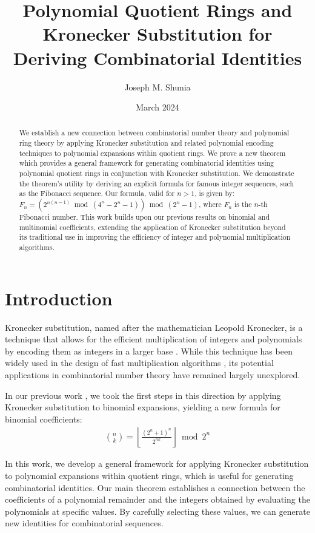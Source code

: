 \documentclass[12pt,reqno]{article}
\theoremstyle{plain}
\theoremstyle{definition}
\begin{document}
\title{Polynomial Quotient Rings and Kronecker Substitution for Deriving Combinatorial Identities}
\author{Joseph M. Shunia}
\date{March 2024}

\maketitle

\begin{abstract}
We establish a new connection between combinatorial number theory and polynomial ring theory by applying Kronecker substitution and related polynomial encoding techniques to polynomial expansions within quotient rings. We prove a new theorem which provides a general framework for generating combinatorial identities using polynomial quotient rings in conjunction with Kronecker substitution. We demonstrate the theorem's utility by deriving an explicit formula for famous integer sequences, such as the Fibonacci sequence. Our formula, valid for $n > 1$, is given by: $F_n = (2^{n (n - 1)} \bmod{(4^n-2^n-1)}) \bmod{(2^n-1)}$, where $F_n$ is the $n$-th Fibonacci number. This work builds upon our previous results on binomial and multinomial coefficients, extending the application of Kronecker substitution beyond its traditional use in improving the efficiency of integer and polynomial multiplication algorithms.
\end{abstract}

\section{Introduction}
Kronecker substitution, named after the mathematician Leopold Kronecker, is a technique that allows for the efficient multiplication of integers and polynomials by encoding them as integers in a larger base \cite{kronecker1882}. While this technique has been widely used in the design of fast multiplication algorithms \cite{harvey2009kronecker, harvey2014faster}, its potential applications in combinatorial number theory have remained largely unexplored.

In our previous work \cite{shunia2023simple}, we took the first steps in this direction by applying Kronecker substitution to binomial expansions, yielding a new formula for binomial coefficients:
\begin{align*}
    \binom{n}{k} = \left\lfloor \frac{(2^n+1)^n}{2^{n k}} \right\rfloor \bmod{2^n}
\end{align*}

In this work, we develop a general framework for applying Kronecker substitution to polynomial expansions within quotient rings, which is useful for generating combinatorial identities. Our main theorem establishes a connection between the coefficients of a polynomial remainder and the integers obtained by evaluating the polynomials at specific values. By carefully selecting these values, we can generate new identities for combinatorial sequences.
\end{document}
